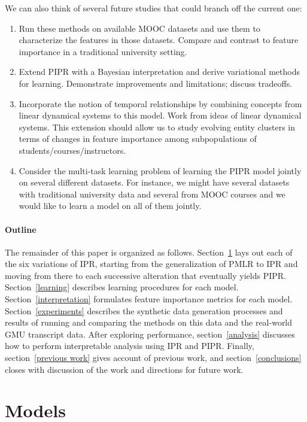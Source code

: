\documentclass[10pt]{proc}
\begin{document}
We can also think of several future studies that could branch off the current
one:

\begin{enumerate}
    \item  Run these methods on available MOOC datasets and use them to
        characterize the features in those datasets. Compare and contrast to
        feature importance in a traditional university setting.
    \item  Extend PIPR with a Bayesian interpretation and derive variational
        methods for learning. Demonstrate improvements and limitations; discuss
        tradeoffs.
    \item  Incorporate the notion of temporal relationships by combining
        concepts from linear dynamical systems to this model. Work from ideas of
        linear dynamical systems. This extension should allow us to study
        evolving entity clusters in terms of changes in feature importance
        among subpopulations of students/courses/instructors.
    \item  Consider the multi-task learning problem of learning the PIPR model
        jointly on several different datasets. For instance, we might have
        several datasets with traditional university data and several from MOOC
        courses and we would like to learn a model on all of them jointly.
\end{enumerate}

\paragraph{Outline}
The remainder of this paper is organized as follows.
Section~\ref{models} lays out each of the six variations of IPR, starting from
the generalization of PMLR to IPR and moving from there to each successive
alteration that eventually yields PIPR. Section~\ref{learning} describes
learning procedures for each model. Section~\ref{interpretation} formulates
feature importance metrics for each model. Section~\ref{experiments}
describes the synthetic data generation processes and results of running and
comparing the methods on this data and the real-world GMU transcript data. After
exploring performance, section~\ref{analysis} discusses how to perform
interpretable analysis using IPR and PIPR. Finally, section~\ref{previous work}
gives account of previous work, and section~\ref{conclusions} closes with
discussion of the work and directions for future work.

\section{Models}\label{models}
\end{document}
